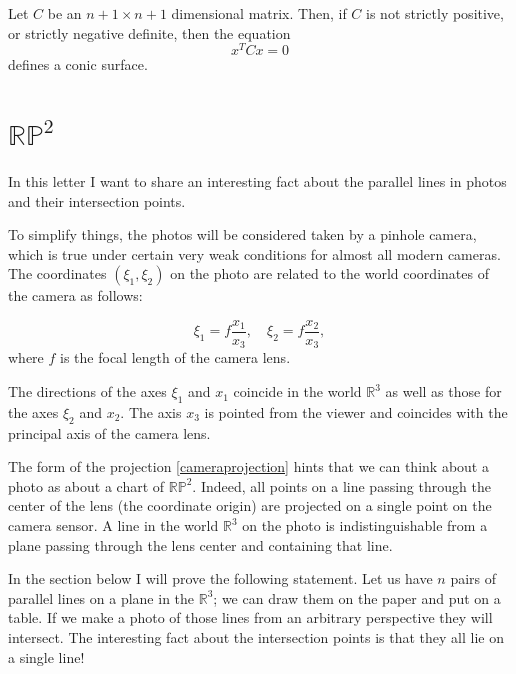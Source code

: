 \documentclass[a4paper,10pt]{article}
\begin{document}
Let $C$ be an $n+1 \times n+1$ dimensional matrix. Then, if $C$ is not strictly positive, or strictly negative definite, then the equation
\begin{equation}
 x^T C x = 0\label{conic}
\end{equation}
defines a conic surface.





\section{$\mathbb{RP}^2$}


In this letter I want to share an interesting fact about the parallel lines in photos and their intersection points.

 To simplify things, the photos will be considered taken by a pinhole camera, which is true under certain very weak conditions for almost all modern cameras. The coordinates $(\xi_1, \xi_2)$  on the photo are related to the world coordinates of the camera as follows:

\begin{equation}
\xi_1 = f\frac{x_1}{x_3}, \quad \xi_2 = f\frac{x_2}{x_3},\label{cameraprojection}
\end{equation}
where $f$ is the focal length of the camera lens.

The directions of the axes $\xi_1$ and $x_1$ coincide in the world $\mathbb{R}^3$ as well as those for the axes  $\xi_2$ and $x_2$. The axis $x_3$ is pointed from the viewer and coincides with the principal axis of the camera lens. 

The form of the projection \eqref{cameraprojection} hints that we can think about a photo as about a chart of $\mathbb{RP}^2$. Indeed, all points on a line passing through the center of the lens (the coordinate origin) are projected on a single point on the camera sensor. A line in the world $\mathbb{R}^3$ on the photo is indistinguishable from a plane passing through the lens center and containing that line.  

In the section below I will prove the following statement. Let us have $n$ pairs of parallel lines on a plane in the $\mathbb{R}^3$; we can draw them on the paper and put on a table. If we make a photo of those lines from an arbitrary perspective they will intersect. The interesting fact about  the intersection points is that they all lie on a single line!
\end{document}
